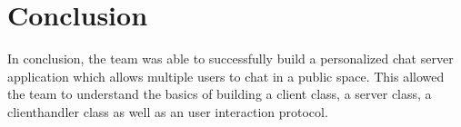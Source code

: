 \documentclass[11pt,letterpaper]{article}
\begin{document}
\section{Conclusion}
In conclusion, the team was able to successfully build a personalized chat server application which allows multiple users to chat in a public space. This allowed the team to understand the basics of building a client class, a server class, a clienthandler class as well as an user interaction protocol.
\end{document}
